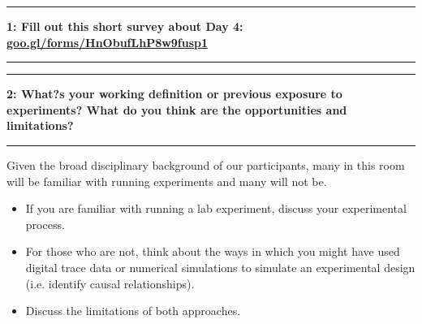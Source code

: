 \documentclass[11pt]{article}
\newcommand\question[2]{\vspace{.25in}\hrule\textbf{#1: #2}\vspace{.5em}\hrule\vspace{.10in}}
\begin{document}
\raggedright
\newcommand\NAME{Allie Morgan} 

\vspace{-0.2 in}
\question{1}{Fill out this short survey about Day 4: \href{https://goo.gl/forms/HnObufLhP8w9fusp1}{goo.gl/forms/HnObufLhP8w9fusp1}} 
\vspace{1 in}

\question{2}{What?s your working definition or previous exposure to experiments? What do you think are the opportunities and limitations?}

Given the broad disciplinary background of our participants, many in this room will be familiar with running experiments and many will not be. 
\begin{itemize}
\item If you are familiar with running a lab experiment, discuss your experimental process. 
\item For those who are not, think about the ways in which you might have used digital trace data or numerical simulations to simulate an experimental design (i.e. identify causal relationships). 
\item Discuss the limitations of both approaches.
\end{itemize}
\end{document}
